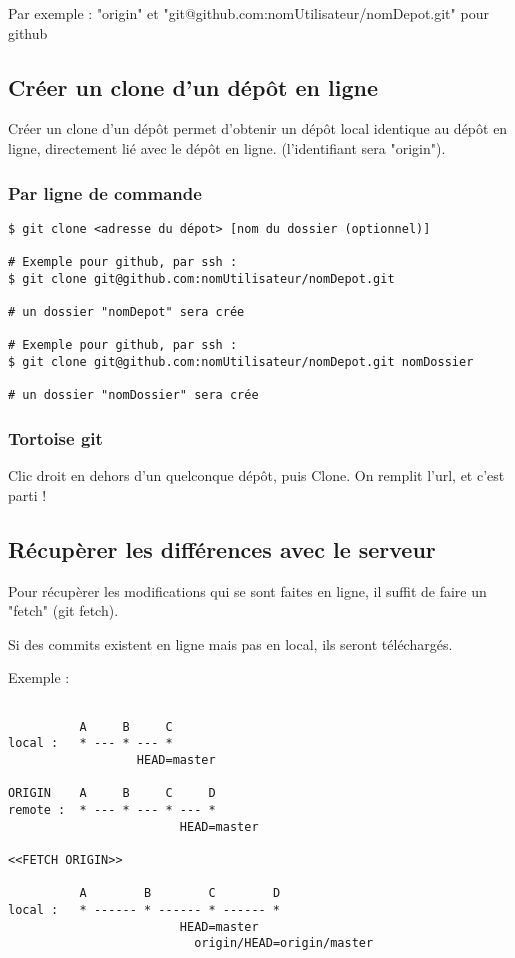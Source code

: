 Par exemple : "origin" et "git@github.com:nomUtilisateur/nomDepot.git" pour github

\newpage
\subsection{Créer un clone d'un dépôt en ligne}

Créer un clone d'un dépôt permet d'obtenir un dépôt local identique au dépôt en ligne, directement lié avec le dépôt en ligne. (l'identifiant sera "origin").

\subsubsection{Par ligne de commande}
\begin{verbatim}
$ git clone <adresse du dépot> [nom du dossier (optionnel)]

# Exemple pour github, par ssh :
$ git clone git@github.com:nomUtilisateur/nomDepot.git

# un dossier "nomDepot" sera crée

# Exemple pour github, par ssh :
$ git clone git@github.com:nomUtilisateur/nomDepot.git nomDossier

# un dossier "nomDossier" sera crée
\end{verbatim}

\subsubsection{Tortoise git}
Clic droit en dehors d'un quelconque dépôt, puis Clone.
On remplit l'url, et c'est parti !

\subsection{Récupèrer les différences avec le serveur}
Pour récupèrer les modifications qui se sont faites en ligne, il suffit de faire un "fetch"
(git fetch).

Si des commits existent en ligne mais pas en local, ils seront téléchargés.

Exemple :
\begin{verbatim}

          A     B     C
local :   * --- * --- *     
                  HEAD=master

ORIGIN    A     B     C     D
remote :  * --- * --- * --- *
                        HEAD=master
   
<<FETCH ORIGIN>>

          A        B        C        D         
local :   * ------ * ------ * ------ *
                        HEAD=master
                          origin/HEAD=origin/master
\end{verbatim}

